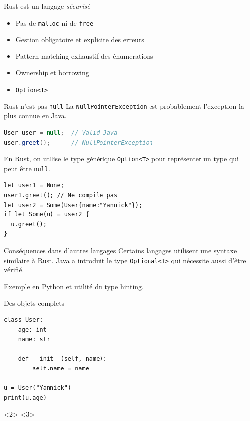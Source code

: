 \documentclass[usenames,dvipsnames]{beamer}
\begin{document}
\begin{frame}[fragile]{Rust est un langage \textit{sécurisé}}
	\begin{itemize}
		\item Pas de \texttt{malloc} ni de \texttt{free}
		\item Gestion obligatoire et explicite des erreurs 
		\item Pattern matching exhaustif des énumerations
		\item Ownership et borrowing
		\item \texttt{Option<T>}
	\end{itemize}
\end{frame}


\begin{frame}[fragile]{Rust n'est pas \texttt{null}}
	La \texttt{NullPointerException} est probablement l'exception la plus connue en Java.
	
	\begin{lstlisting}[language=java]
User user = null;  // Valid Java
user.greet();      // NullPointerException
	\end{lstlisting}
	
	En Rust, on utilise le type générique \texttt{Option<T>} pour représenter un type qui peut être \texttt{null}.
	
	\begin{lstlisting}
let user1 = None;
user1.greet(); // Ne compile pas
let user2 = Some(User{name:"Yannick"});
if let Some(u) = user2 {
  u.greet();
}
\end{lstlisting}
\end{frame}

\begin{frame}[fragile]{Conséquences dans d'autres langages}
	Certains langages utilisent une syntaxe similaire à Rust. Java a introduit le type \texttt{Optional<T>} qui nécessite aussi d'être vérifié.
	
	Exemple en Python et utilité du type hinting.
\end{frame}

\begin{frame}[fragile]{Des objets complets}
	\begin{lstlisting}
class User:
	age: int
	name: str
	
	def __init__(self, name):
		self.name = name

u = User("Yannick")
print(u.age)
	\end{lstlisting}
	
\end{frame}
\end{document}
